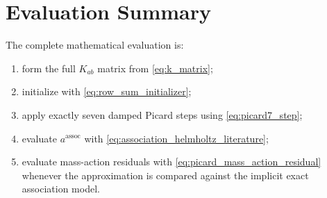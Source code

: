 \documentclass[12pt,letterpaper]{article}
\newcommand{\assoc}{\mathrm{assoc}}
\begin{document}
\section{Evaluation Summary}

The complete mathematical evaluation is:
\begin{enumerate}
    \item form the full \(K_{ab}\) matrix from
    \eqref{eq:k_matrix};
    \item initialize with \eqref{eq:row_sum_initializer};
    \item apply exactly seven damped Picard steps using
    \eqref{eq:picard7_step};
    \item evaluate \(a^\assoc\) with
    \eqref{eq:association_helmholtz_literature};
    \item evaluate mass-action residuals with
    \eqref{eq:picard_mass_action_residual} whenever the approximation is
    compared against the implicit exact association model.
\end{enumerate}

\printbibliography
\end{document}

